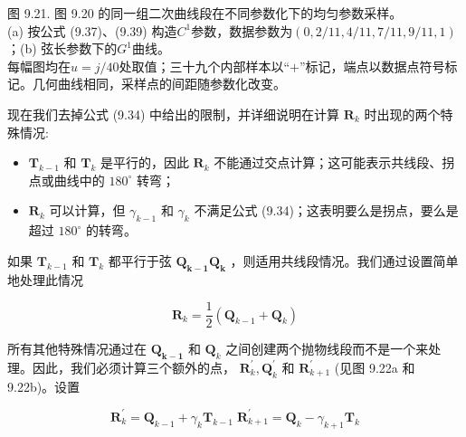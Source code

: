 \documentclass[../main.tex]{subfiles}
\begin{document}
\begin{center}
\begin{minipage}{29cm}
\vspace*{.6\baselineskip}
\centering
{}
\par\smallskip
{}
\par\smallskip
图 9.21. 图 9.20 的同一组二次曲线段在不同参数化下的均匀参数采样。\\
(a) 按公式 (9.37)、(9.39) 构造$C^1$参数，数据参数为$(0,2/11,4/11,7/11,9/11,1)$；(b) 弦长参数下的$G^1$曲线。\\
每幅图均在$u=j/40$处取值；三十九个内部样本以“$+$”标记，端点以数据点符号标记。几何曲线相同，采样点的间距随参数化改变。
\end{minipage}
\end{center}

现在我们去掉公式 (9.34) 中给出的限制，并详细说明在计算 \({\mathbf{R}}_{k}\) 时出现的两个特殊情况:

\begin{itemize}
\item \({\mathbf{T}}_{k - 1}\) 和 \({\mathbf{T}}_{k}\) 是平行的，因此 \({\mathbf{R}}_{k}\) 不能通过交点计算；这可能表示共线段、拐点或曲线中的 \({180}^{ \circ  }\) 转弯；
\end{itemize}

\begin{itemize}
\item \({\mathbf{R}}_{k}\) 可以计算，但 \({\gamma }_{k - 1}\) 和 \({\gamma }_{k}\) 不满足公式 (9.34)；这表明要么是拐点，要么是超过 \({180}^{ \circ  }\) 的转弯。
\end{itemize}

如果 \({\mathbf{T}}_{k - 1}\) 和 \({\mathbf{T}}_{k}\) 都平行于弦 \({\mathbf{Q}}_{\mathbf{k} - \mathbf{1}}{\mathbf{Q}}_{\mathbf{k}}\) ，则适用共线段情况。我们通过设置简单地处理此情况





\[
{\mathbf{R}}_{k} = \frac{1}{2}\left( {{\mathbf{Q}}_{k - 1} + {\mathbf{Q}}_{k}}\right)  \tag{9.40}
\]

所有其他特殊情况通过在 \({\mathbf{Q}}_{\mathbf{k} - \mathbf{1}}\) 和 \({\mathbf{Q}}_{k}\) 之间创建两个抛物线段而不是一个来处理。因此，我们必须计算三个额外的点， \({\mathbf{R}}_{k}^{\prime },{\mathbf{Q}}_{k}^{\prime }\) 和 \({\mathbf{R}}_{k + 1}^{\prime }\) (见图 9.22a 和 9.22b)。设置

\[
{\mathbf{R}}_{k}^{\prime } = {\mathbf{Q}}_{k - 1} + {\gamma }_{k}{\mathbf{T}}_{k - 1}\;{\mathbf{R}}_{k + 1}^{\prime } = {\mathbf{Q}}_{k} - {\gamma }_{k + 1}{\mathbf{T}}_{k} \tag{9.41}
\]
\end{document}
